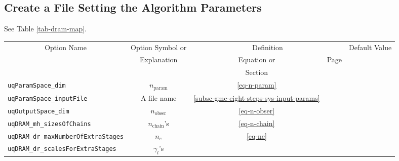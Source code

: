 \subsection{Create a File Setting the Algorithm Parameters}\label{subsc-gmc-eight-steps-alg-params}

See Table \ref{tab-dram-map}.

\begin{sidewaystable}[h]
\begin{center}
\begin{tabular}{|l|c|c|c|c|}
\hline
\multicolumn{1}{|c|}{Option Name}        & Option Symbol or                    & \multicolumn{2}{c|}{Definition}                                                                 & Default Value \\
\cline{3-4}
                                         & Explanation                         & Equation or                                  & Page                                             &               \\
                                         &                                     & Section                                      &                                                  &               \\
\hline
\verb=uqParamSpace_dim=                  & $n_{\text{param}}$                    & \eqref{eq-n-param}                             & \pageref{eq-n-param}                               &               \\
\hline
\verb=uqParamSpace_inputFile=            & A file name                         & \ref{subsc-gmc-eight-steps-sys-input-params} & \pageref{subsc-gmc-eight-steps-sys-input-params} &               \\
\hline
\verb=uqOutputSpace_dim=                 & $n_{\text{obser}}$                    & \eqref{eq-n-obser}                             & \pageref{eq-n-obser}                               &               \\
\hline
\verb=uqDRAM_mh_sizesOfChains=           & $n_{\text{chain}}$'s                & \eqref{eq-n-chain}                           & \pageref{eq-n-chain}                             &               \\
\hline
\verb=uqDRAM_dr_maxNumberOfExtraStages=  & $n_e$                               & \eqref{eq-ne}                                & \pageref{eq-ne}                                  &               \\
\hline
\verb=uqDRAM_dr_scalesForExtraStages=    & $\gamma_l$'s                        &                                              &                                                  &               \\

\end{tabular}
\end{center}
\end{sidewaystable}
